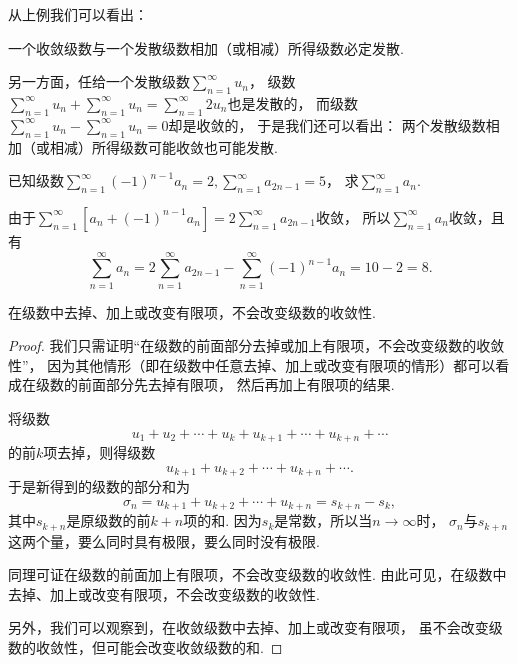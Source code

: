 从上例我们可以看出：
\begin{proposition}\label{theorem:无穷级数.收敛级数性质2.推论1}
一个收敛级数与一个发散级数相加（或相减）所得级数必定发散.
\end{proposition}

另一方面，任给一个发散级数\(\sum_{n=1}^\infty u_n\)，
级数\(\sum_{n=1}^\infty u_n + \sum_{n=1}^\infty u_n
= \sum_{n=1}^\infty 2 u_n\)也是发散的，
而级数\(\sum_{n=1}^\infty u_n - \sum_{n=1}^\infty u_n
= 0\)却是收敛的，
于是我们还可以看出：
{\color{red}两个发散级数相加（或相减）所得级数可能收敛也可能发散.}

\begin{example}
已知级数\(\sum_{n=1}^\infty (-1)^{n-1} a_n = 2,
\sum_{n=1}^\infty a_{2n-1} = 5\)，
求\(\sum_{n=1}^\infty a_n\).
\begin{solution}
由于\(\sum_{n=1}^\infty [a_n + (-1)^{n-1} a_n]
= 2 \sum_{n=1}^\infty a_{2n-1}\)收敛，
所以\(\sum_{n=1}^\infty a_n\)收敛，且有
\begin{equation*}
\sum_{n=1}^\infty a_n
= 2 \sum_{n=1}^\infty a_{2n-1}
- \sum_{n=1}^\infty (-1)^{n-1} a_n
= 10 - 2 = 8.
\end{equation*}
\end{solution}
\end{example}

\begin{property}\label{theorem:无穷级数.收敛级数性质3}
在级数中去掉、加上或改变有限项，不会改变级数的收敛性.
\begin{proof}
我们只需证明“在级数的前面部分去掉或加上有限项，不会改变级数的收敛性”，
因为其他情形（即在级数中任意去掉、加上或改变有限项的情形）都可以看成在级数的前面部分先去掉有限项，
然后再加上有限项的结果.

将级数\begin{equation*}
u_1+u_2+\dotsb+u_k+u_{k+1}+\dotsb+u_{k+n}+\dotsb
\end{equation*}的前\(k\)项去掉，则得级数\begin{equation*}
u_{k+1}+u_{k+2}+\dotsb+u_{k+n}+\dotsb.
\end{equation*}于是新得到的级数的部分和为\begin{equation*}
\sigma_n = u_{k+1}+u_{k+2}+\dotsb+u_{k+n} = s_{k+n} - s_k,
\end{equation*}其中\(s_{k+n}\)是原级数的前\(k+n\)项的和.
因为\(s_k\)是常数，所以当\(n\to\infty\)时，
\(\sigma_n\)与\(s_{k+n}\)这两个量，要么同时具有极限，要么同时没有极限.

同理可证在级数的前面加上有限项，不会改变级数的收敛性.
由此可见，在级数中去掉、加上或改变有限项，不会改变级数的收敛性.

另外，我们可以观察到，在收敛级数中去掉、加上或改变有限项，
虽不会改变级数的收敛性，但可能会改变收敛级数的和.
\end{proof}
\end{property}


